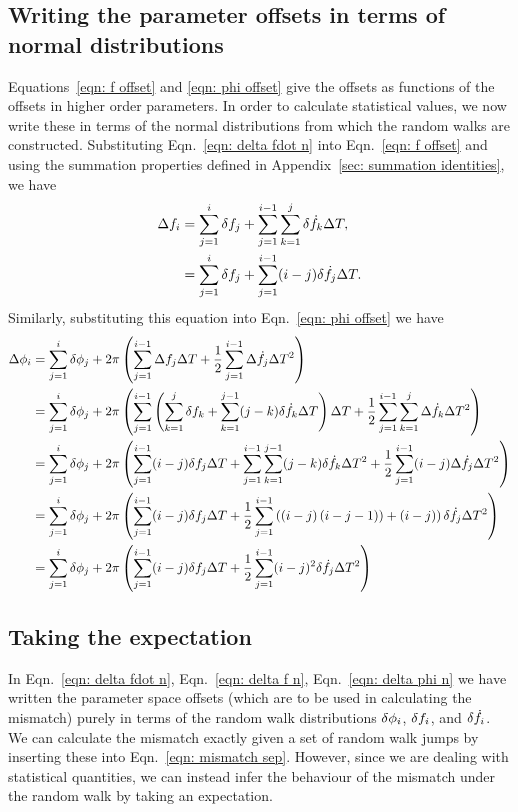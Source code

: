 \subsection{Writing the parameter offsets in terms of normal distributions}
Equations~\eqref{eqn: f offset} and \eqref{eqn: phi
offset} give the offsets as functions of the offsets in higher order
parameters. In order to calculate statistical values, we now write these in terms of
the normal distributions from which the random walks are constructed.
Substituting Eqn.~\eqref{eqn: delta fdot n} into Eqn.~\eqref{eqn: f offset} and using the summation properties defined
in Appendix~\ref{sec: summation identities}, we have
\begin{align}
\Delta f_{i}  & = \sum_{j=1}^{i}\delta f_{j}
+ \sum_{j=1}^{i-1}\sum_{k=1}^{j}\delta \dot{f}_{k} \Delta T ,  \\
& = \sum_{j=1}^{i}\delta f_{j}
+ \sum_{j=1}^{i-1}(i-j)\delta \dot{f}_{j} \Delta T .
\label{eqn: delta f n}
\end{align}
Similarly, substituting this equation into Eqn.~\eqref{eqn: phi offset} we
have
\begin{align}
\begin{split}
\Delta\phi_{i} & = \sum_{j=1}^{i}\delta \phi_{j}
+ 2\pi \left(\sum_{j=1}^{i-1}\Delta f_{j}\Delta T
+ \frac{1}{2}\sum_{j=1}^{i-1}\Delta\dot{f}_{j}\Delta T^{2}\right) \\
& = \sum_{j=1}^{i}\delta \phi_{j} + 2\pi\left(\sum_{j=1}^{i-1}\left(\sum_{k=1}^{j}\delta f_{k}
+ \sum_{k=1}^{j-1}(j-k)\delta\dot{f}_{k}\Delta T\right)\Delta T
 + \frac{1}{2}\sum_{j=1}^{i-1}\sum_{k=1}^{j}\Delta\dot{f}_{k}\Delta T^{2} \right)  \\
& = \sum_{j=1}^{i}\delta \phi_{j} + 2\pi\left(\sum_{j=1}^{i-1}(i-j)\delta f_{j}\Delta T
 + \sum_{j=1}^{i-1}\sum_{k=1}^{j-1}(j-k)\delta\dot{f}_{k}\Delta T^{2}
 + \frac{1}{2}\sum_{j=1}^{i-1}(i-j)\Delta\dot{f}_{j}\Delta T^{2} \right)  \\
& = \sum_{j=1}^{i}\delta \phi_{j} + 2\pi\left(\sum_{j=1}^{i-1}(i-j)\delta f_{j}\Delta T
 + \frac{1}{2}\sum_{j=1}^{i-1}\left(\left(i-j\right)\left(i-j-1)\right)
 + (i-j)\right)\delta\dot{f}_{j}\Delta T^{2}\right)  \\
& = \sum_{j=1}^{i}\delta \phi_{j} + 2\pi\left(\sum_{j=1}^{i-1}(i-j)\delta f_{j}\Delta T
 + \frac{1}{2}\sum_{j=1}^{i-1}(i-j)^{2}\delta\dot{f}_{j}\Delta T^{2}\right)
\end{split}
\label{eqn: delta phi n}
\end{align}

\subsection{Taking the expectation}

In Eqn.~\eqref{eqn: delta fdot n}, Eqn.~\eqref{eqn: delta f n},
Eqn.~\eqref{eqn: delta phi n} we have written the parameter space offsets
(which are to be used in calculating the mismatch) purely in terms of the
random walk distributions $\delta \phi_i$, $\delta f_i$, and $\delta \dot{f}_i$. We can
calculate the mismatch exactly given a set of random walk jumps by inserting
these into Eqn.~\eqref{eqn: mismatch sep}. However, since we are dealing with
statistical quantities, we can instead infer the behaviour of the mismatch
under the random walk by taking an expectation.

